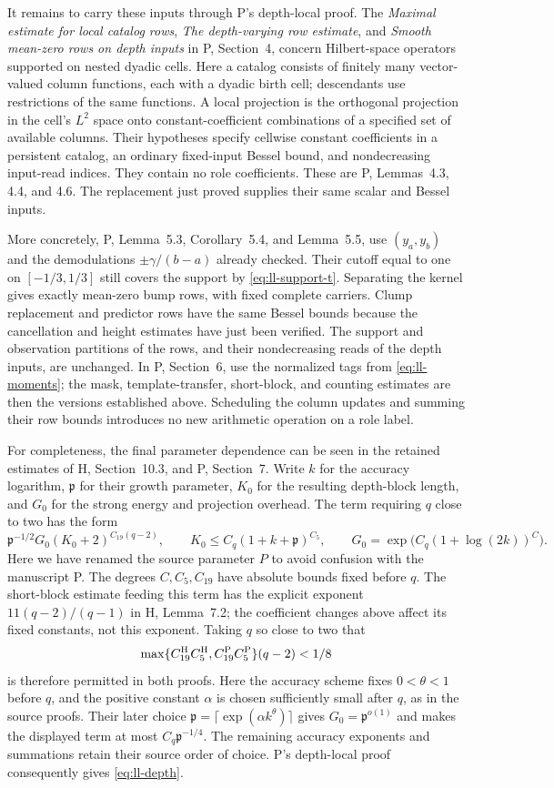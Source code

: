 It remains to carry these inputs through P's depth-local proof.
The \emph{Maximal estimate for local catalog rows},
\emph{The depth-varying row estimate}, and
\emph{Smooth mean-zero rows on depth inputs} in P, Section~4,
concern Hilbert-space operators supported on nested dyadic cells.
Here a catalog consists of finitely many vector-valued column
functions, each with a dyadic birth cell; descendants use restrictions
of the same functions.  A local projection is the orthogonal
projection in the cell's $L^2$ space onto constant-coefficient
combinations of a specified set of available columns.
Their hypotheses specify cellwise constant coefficients in a
persistent catalog, an ordinary fixed-input Bessel bound, and
nondecreasing input-read indices.  They contain no role coefficients.
These are P, Lemmas~4.3, 4.4, and 4.6.  The replacement just proved
supplies their same scalar and Bessel inputs.

More concretely, P, Lemma~5.3, Corollary~5.4, and Lemma~5.5,
use
$(y_a,y_b)$ and the demodulations $\pm\gamma/(b-a)$ already checked.
Their cutoff equal to one on $[-1/3,1/3]$ still covers the support
by \eqref{eq:ll-support-t}.  Separating the kernel gives exactly
mean-zero bump rows, with fixed complete carriers.  Clump replacement
and predictor rows have the same Bessel bounds because the
cancellation and height estimates have just been verified.  The
support and observation partitions of the rows, and their
nondecreasing reads of the depth inputs, are unchanged.  In P,
Section~6, use the normalized tags from \eqref{eq:ll-moments}; the
mask, template-transfer, short-block, and counting estimates are
then the versions established above.  Scheduling the column
updates and summing their row bounds introduces no new arithmetic
operation on a role label.

For completeness, the final parameter dependence can be seen in
the retained estimates of H, Section~10.3, and P, Section~7.
Write $k$ for the accuracy logarithm, $\mathfrak p$ for their
growth parameter, $K_0$ for the resulting depth-block length, and
$G_0$ for the strong energy and projection overhead.  The term
requiring $q$ close to two has the form
\[
 \mathfrak p^{-1/2}G_0(K_0+2)^{C_{19}(q-2)},\qquad
 K_0\le C_q(1+k+\mathfrak p)^{C_5},\qquad
 G_0=\exp\!\bigl(C_q(1+\log(2k))^C\bigr).
\]
Here we have renamed the source parameter $P$ to avoid confusion
with the manuscript P.  The degrees $C,C_5,C_{19}$ have absolute
bounds fixed before $q$.  The short-block estimate feeding this
term has the explicit exponent $11(q-2)/(q-1)$ in H, Lemma~7.2;
the coefficient changes above affect its fixed constants, not this
exponent.  Taking $q$ so close to two that
\[
 \max\{C_{19}^{\rm H}C_5^{\rm H},
       C_{19}^{\rm P}C_5^{\rm P}\}(q-2)<1/8
\]
is therefore permitted in both proofs.  Here the accuracy scheme
fixes $0<\theta<1$ before $q$, and the positive constant $\alpha$
is chosen sufficiently small after $q$, as in the source proofs.
Their later choice $\mathfrak p=\lceil\exp(\alpha k^\theta)\rceil$ gives
$G_0=\mathfrak p^{o(1)}$ and makes the displayed term at most
$C_q\mathfrak p^{-1/4}$.  The remaining accuracy exponents and
summations retain their source order of choice.  P's depth-local
proof consequently gives \eqref{eq:ll-depth}.

